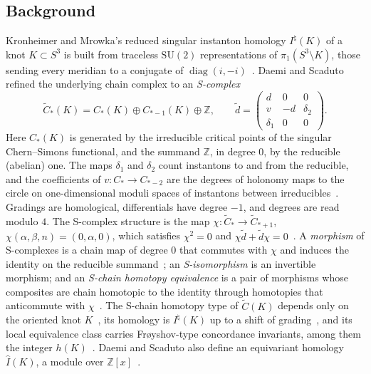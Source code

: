 \documentclass[11pt,reqno]{amsart}
\theoremstyle{plain}
\theoremstyle{definition}
\newcommand{\Z}{\mathbb{Z}}
\newcommand{\SU}{\mathrm{SU}(2)}
\newcommand{\Inat}{I^{\natural}}
\newcommand{\td}{\widetilde d}
\newcommand{\tC}{\widetilde C}
\begin{document}
\subsection{Background}
Kronheimer and Mrowka's reduced singular instanton homology $\Inat(K)$ of a knot $K\subset S^3$ is
built from traceless $\SU$ representations of $\pi_1(S^3\setminus K)$, those sending every meridian to
a conjugate of $\operatorname{diag}(i,-i)$~\cite{KM1,KM2}. Daemi and Scaduto refined the underlying
chain complex to an \emph{S-complex}~\cite[Def.~3.21]{DSEquiv}
\[
\tC_*(K)=C_*(K)\oplus C_{*-1}(K)\oplus\Z,\qquad
\td=\begin{pmatrix} d&0&0\\ v&-d&\delta_2\\ \delta_1&0&0\end{pmatrix}.
\]
Here $C_*(K)$ is generated by the irreducible critical points of the singular Chern--Simons functional,
and the summand $\Z$, in degree $0$, by the reducible (abelian) one. The maps $\delta_1$ and $\delta_2$
count instantons to and from the reducible, and the coefficients of $v\colon C_*\to C_{*-2}$ are the
degrees of holonomy maps to the circle on one-dimensional moduli spaces of instantons between
irreducibles~\cite[\S3.3, (3.15)]{DSEquiv}. Gradings are homological, differentials have degree $-1$, and degrees
are read modulo $4$. The S-complex structure is the map $\chi\colon\tC_*\to\tC_{*+1}$,
$\chi(\alpha,\beta,n)=(0,\alpha,0)$, which satisfies $\chi^2=0$ and
$\chi\td+\td\chi=0$~\cite[\S4.1]{DSEquiv}. A \emph{morphism} of S-complexes is a chain map of degree $0$
that commutes with $\chi$ and induces the identity on the reducible summand~\cite[Def.~3.28,
\S4.1]{DSEquiv}; an \emph{S-isomorphism} is an invertible morphism; and an \emph{S-chain homotopy
equivalence} is a pair of morphisms whose composites are chain homotopic to the identity through
homotopies that anticommute with $\chi$~\cite[Def.~3.30, \S4.1]{DSEquiv}. The S-chain homotopy type of
$\tC(K)$ depends only on the oriented knot $K$~\cite[Thm.~3.34, Rem.~3.35]{DSEquiv}, its homology is
$\Inat(K)$ up to a shift of grading~\cite[Thm.~8.9]{DSEquiv}, and its local equivalence class carries
Frøyshov-type concordance invariants, among them the integer $h(K)$~\cite[\S5]{DSEquiv}. Daemi and
Scaduto also define an equivariant homology $\widehat I(K)$, a module over $\Z[x]$~\cite[\S4.3,
Thm.~1.4]{DSEquiv}.
\end{document}
